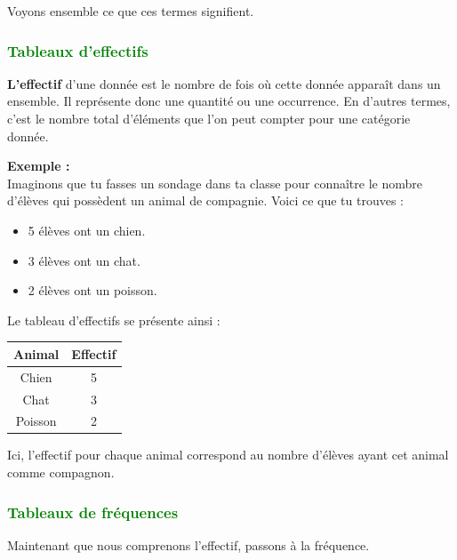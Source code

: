 \documentclass{article}
\begin{document}
Voyons ensemble ce que ces termes signifient.

\subsubsection{\textcolor{green}{Tableaux d'effectifs}}

\begin{tcolorbox}
\textbf{ L'effectif} d'une donnée est le nombre de fois où cette donnée apparaît dans un ensemble. Il représente donc une quantité ou une occurrence. En d'autres termes, c'est le nombre total d'éléments que l'on peut compter pour une catégorie donnée.
\end{tcolorbox}

\begin{tcolorbox}
\textbf{Exemple :} \\  
Imaginons que tu fasses un sondage dans ta classe pour connaître le nombre d'élèves qui possèdent un animal de compagnie. Voici ce que tu trouves :
\begin{itemize}
    \item 5 élèves ont un chien.
    \item 3 élèves ont un chat.
    \item 2 élèves ont un poisson.
\end{itemize}
Le tableau d'effectifs se présente ainsi :

\begin{center}
\begin{tabular}{|c|c|}
\hline
Animal & Effectif \\
\hline
Chien & 5 \\
Chat & 3 \\
Poisson & 2 \\
\hline
\end{tabular}
\end{center}

Ici, l'effectif pour chaque animal correspond au nombre d'élèves ayant cet animal comme compagnon.
\end{tcolorbox}

\subsubsection{\textcolor{green}{Tableaux de fréquences}}

Maintenant que nous comprenons l'effectif, passons à la fréquence.
\end{document}
